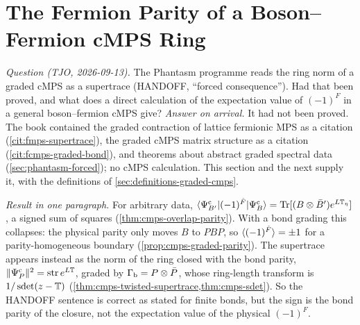 
\section{The Fermion Parity of a Boson--Fermion cMPS Ring}
\label{sec:cmps-parity}

\emph{Question (TJO, 2026-09-13).} The Phantasm programme reads the ring norm of a graded
cMPS as a supertrace (HANDOFF, ``forced consequence''). Had that been proved, and what does a
direct calculation of the expectation value of $(-1)^F$ in a general boson--fermion cMPS
give? \emph{Answer on arrival.} It had not been proved. The book contained the graded
contraction of lattice fermionic MPS as a citation (\cref{cit:fmps-supertrace}), the graded
cMPS matrix structure as a citation (\cref{cit:fcmps-graded-bond}), and theorems about
abstract graded spectral data (\cref{sec:phantasm-forced}); no cMPS calculation. This section
and the next supply it, with the definitions of \cref{sec:definitions-graded-cmps}.

\emph{Result in one paragraph.} For arbitrary data, $\langle\Psi^{\mathrm c}_{B'}|(-1)^{\hat F}|\Psi^{\mathrm c}_{B}\rangle =
\operatorname{Tr}[(B\otimes\bar B')e^{L\mathbb T_\eta}]$, a signed sum of squares
(\cref{thm:cmps-overlap-parity}). With a bond grading this collapses: the physical parity only
moves $B$ to $PBP$, so $\langle(-1)^{\hat F}\rangle=\pm1$ for a parity-homogeneous boundary
(\cref{prop:cmps-graded-parity}). The supertrace appears instead as the norm of the ring closed
with the bond parity, $\|\Psi^{\mathrm c}_{P}\|^2=\operatorname{str} e^{L\mathbb T}$, graded by $\Gamma_{\mathrm b}=P\otimes\bar P$, whose
ring-length transform is $1/\operatorname{sdet}(z-\mathbb T)$ (\cref{thm:cmps-twisted-supertrace,thm:cmps-sdet}).
So the HANDOFF sentence is correct as stated for finite bonds, but the sign is the bond
parity of the closure, not the expectation value of the physical $(-1)^F$.

